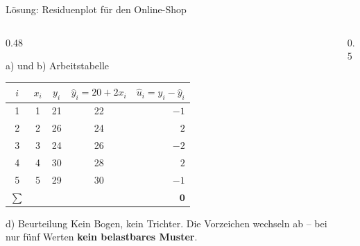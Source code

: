 \documentclass[aspectratio=169,11pt]{beamer}
\def\uebresliste{22/-1,24/2,26/-2,28/2,30/-1}
\newcommand{\residuenplotvon}[2]{%
  \foreach \px/\py in #1 {%
    \edef\tmpdraw{\noexpand\draw[resred!70, line width=1.2pt, #2] (axis cs:\px,0) -- (axis cs:\px,\py);
      \noexpand\fill[hsbiblue, #2] (axis cs:\px,\py) circle[radius=2.2pt];}%
    \tmpdraw
  }}
\begin{document}
\begin{frame}{Lösung: Residuenplot für den Online-Shop}
  \begin{columns}[T]
    \begin{column}{0.48\textwidth}
      \small
      \begin{block}{a) und b) Arbeitstabelle}
        \begin{center}
          \renewcommand{\arraystretch}{0.9}
          \begin{tabular}{c|cc|c|r}
            \toprule
            $i$ & $x_i$ & $y_i$ & $\hat{y}_i = 20 + 2x_i$ & $\hat{u}_i = y_i - \hat{y}_i$ \\
            \midrule
            1 & 1 & 21 & 22 & $-1$ \\
            2 & 2 & 26 & 24 & $2$  \\
            3 & 3 & 24 & 26 & $-2$ \\
            4 & 4 & 30 & 28 & $2$  \\
            5 & 5 & 29 & 30 & $-1$ \\
            \midrule
            $\sum$ & & & & $\mathbf{0}$ \\
            \bottomrule
          \end{tabular}
        \end{center}
      \end{block}
      \begin{exampleblock}{d) Beurteilung}
        Kein Bogen, kein Trichter. Die Vorzeichen wechseln ab -- bei nur fünf
        Werten \textbf{kein belastbares Muster}.
      \end{exampleblock}
    \end{column}
    \begin{column}{0.5\textwidth}
    \end{column}
  \end{columns}
\end{frame}
\end{document}
